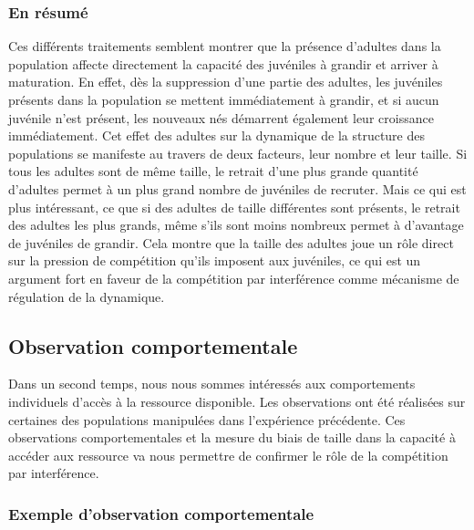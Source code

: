 \subsubsection{En résumé}

Ces différents traitements semblent montrer que la présence d'adultes dans la
population affecte directement la capacité des juvéniles à grandir et arriver
à maturation. En effet, dès la suppression d'une partie des adultes, les
juvéniles présents dans la population se mettent immédiatement à grandir, et si
aucun juvénile n'est présent, les nouveaux nés démarrent également leur
croissance immédiatement. Cet effet des adultes sur la dynamique de la structure
des populations se manifeste au travers de deux facteurs, leur nombre et leur
taille. Si tous les adultes sont de même taille, le retrait d'une plus grande
quantité d'adultes permet à un plus grand nombre de juvéniles de recruter. Mais
ce qui est plus intéressant, ce que si des adultes de taille différentes sont
présents, le retrait des adultes les plus grands, même s'ils sont moins nombreux
permet à d'avantage de juvéniles de grandir. Cela montre que la taille des
adultes joue un rôle direct sur la pression de compétition qu'ils imposent aux
juvéniles, ce qui est un argument fort en faveur de la compétition par
interférence comme mécanisme de régulation de la dynamique. 

\subsection{Observation comportementale}

Dans un second temps, nous nous sommes intéressés aux comportements
individuels d'accès à la ressource disponible. Les observations ont été
réalisées sur certaines des populations manipulées dans l'expérience précédente.
Ces observations comportementales et la mesure du biais de taille dans la capacité à accéder aux
ressource va nous permettre de confirmer le rôle de la compétition par
interférence.

\subsubsection{Exemple d'observation comportementale}


